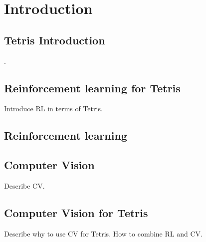 \section{Introduction} %
 

\subsection{Tetris Introduction}
.

\subsection{Reinforcement learning for Tetris}
Introduce RL in terms of Tetris.

\subsection{Reinforcement learning}


\subsection{Computer Vision}
Describe CV.

\subsection{Computer Vision for Tetris}
Describe why to use CV for Tetris.
How to combine RL and CV.

